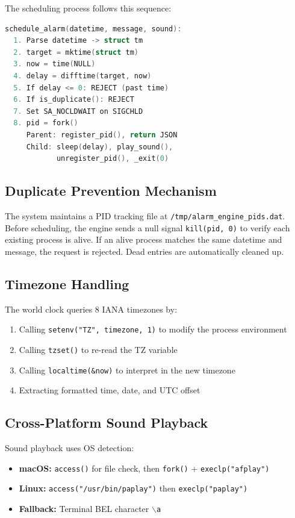 \documentclass[conference]{IEEEtran}
\begin{document}
The scheduling process follows this sequence:

\begin{lstlisting}[caption={Alarm Scheduling Algorithm},language=C]
schedule_alarm(datetime, message, sound):
  1. Parse datetime -> struct tm
  2. target = mktime(struct tm)
  3. now = time(NULL)
  4. delay = difftime(target, now)
  5. If delay <= 0: REJECT (past time)
  6. If is_duplicate(): REJECT
  7. Set SA_NOCLDWAIT on SIGCHLD
  8. pid = fork()
     Parent: register_pid(), return JSON
     Child: sleep(delay), play_sound(),
            unregister_pid(), _exit(0)
\end{lstlisting}

\subsection{Duplicate Prevention Mechanism}

The system maintains a PID tracking file at \texttt{/tmp/alarm\_engine\_pids.dat}. Before scheduling, the engine sends a null signal \texttt{kill(pid, 0)} to verify each existing process is alive. If an alive process matches the same datetime and message, the request is rejected. Dead entries are automatically cleaned up.

\subsection{Timezone Handling}

The world clock queries 8 IANA timezones by:
\begin{enumerate}
    \item Calling \texttt{setenv("TZ", timezone, 1)} to modify the process environment
    \item Calling \texttt{tzset()} to re-read the TZ variable
    \item Calling \texttt{localtime(\&now)} to interpret in the new timezone
    \item Extracting formatted time, date, and UTC offset
\end{enumerate}

\subsection{Cross-Platform Sound Playback}

Sound playback uses OS detection:
\begin{itemize}
    \item \textbf{macOS:} \texttt{access()} for file check, then \texttt{fork()} + \texttt{execlp("afplay")}
    \item \textbf{Linux:} \texttt{access("/usr/bin/paplay")} then \texttt{execlp("paplay")}
    \item \textbf{Fallback:} Terminal BEL character \texttt{$\backslash$a}
\end{itemize}
\end{document}
